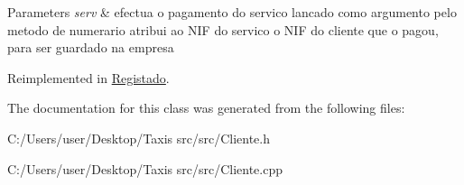 \begin{DoxyParams}{Parameters}
{\em serv} & efectua o pagamento do servico lancado como argumento pelo metodo de numerario atribui ao N\+IF do servico o N\+IF do cliente que o pagou, para ser guardado na empresa \\
\hline
\end{DoxyParams}


Reimplemented in \hyperlink{class_registado_af3c8f63f7df1cdfd27e44126f78b71d8}{Registado}.



The documentation for this class was generated from the following files\+:\begin{DoxyCompactItemize}
\item 
C\+:/\+Users/user/\+Desktop/\+Taxis src/src/Cliente.\+h\item 
C\+:/\+Users/user/\+Desktop/\+Taxis src/src/Cliente.\+cpp\end{DoxyCompactItemize}
